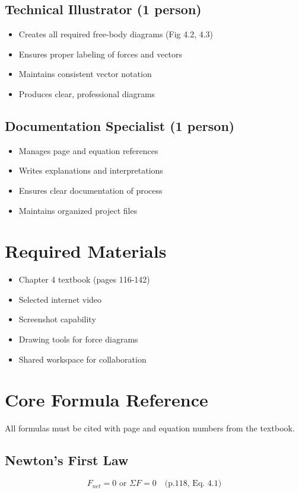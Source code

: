 \documentclass[12pt]{article}
\begin{document}
\subsection{Technical Illustrator (1 person)}
\begin{itemize}
\item Creates all required free-body diagrams (Fig 4.2, 4.3)
\item Ensures proper labeling of forces and vectors
\item Maintains consistent vector notation
\item Produces clear, professional diagrams
\end{itemize}

\subsection{Documentation Specialist (1 person)}
\begin{itemize}
\item Manages page and equation references
\item Writes explanations and interpretations
\item Ensures clear documentation of process
\item Maintains organized project files
\end{itemize}

\section{Required Materials}
\begin{itemize}
\item Chapter 4 textbook (pages 116-142)
\item Selected internet video
\item Screenshot capability
\item Drawing tools for force diagrams
\item Shared workspace for collaboration
\end{itemize}

\section{Core Formula Reference}
All formulas must be cited with page and equation numbers from the textbook.

\subsection{Newton's First Law}
\begin{equation}
F_{net} = 0 \text{ or } \Sigma F = 0 \quad \text{(p.118, Eq. 4.1)}
\end{equation}
\end{document}

